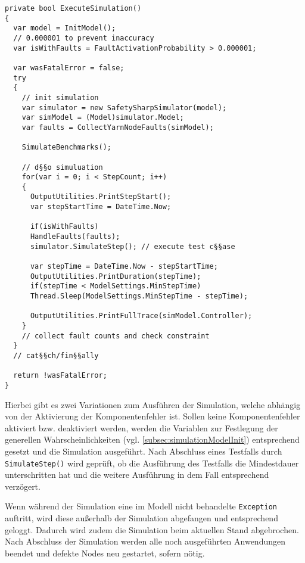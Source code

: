 \begin{lstlisting}[label=lst:hadoopSimulation,style=cs,
caption={[Ausführung der Simulation]
    Ausführung der Simulation (gekürzt).}]
private bool ExecuteSimulation()
{
  var model = InitModel();
  // 0.000001 to prevent inaccuracy
  var isWithFaults = FaultActivationProbability > 0.000001;
  
  var wasFatalError = false;
  try
  {
    // init simulation
    var simulator = new SafetySharpSimulator(model);
    var simModel = (Model)simulator.Model;
    var faults = CollectYarnNodeFaults(simModel);
    
    SimulateBenchmarks();
    
    // d§§o simuluation
    for(var i = 0; i < StepCount; i++)
    {
      OutputUtilities.PrintStepStart();
      var stepStartTime = DateTime.Now;
      
      if(isWithFaults)
      HandleFaults(faults);
      simulator.SimulateStep(); // execute test c§§ase
      
      var stepTime = DateTime.Now - stepStartTime;
      OutputUtilities.PrintDuration(stepTime);
      if(stepTime < ModelSettings.MinStepTime)
      Thread.Sleep(ModelSettings.MinStepTime - stepTime);
      
      OutputUtilities.PrintFullTrace(simModel.Controller);
    }
    // collect fault counts and check constraint
  }
  // cat§§ch/fin§§ally
  
  return !wasFatalError;
}
\end{lstlisting}

Hierbei gibt es zwei Variationen zum Ausführen der Simulation, welche abhängig von der Aktivierung der Komponentenfehler ist.
Sollen keine Komponentenfehler aktiviert bzw. deaktiviert werden, werden die Variablen zur Festlegung der generellen Wahrscheinlichkeiten (vgl. \cref{subsec:simulationModelInit}) entsprechend gesetzt und die Simulation ausgeführt.
Nach Abschluss eines Testfalls durch \texttt{SimulateStep()} wird geprüft, ob die Ausführung des Testfalls die Mindestdauer unterschritten hat und die weitere Ausführung in dem Fall entsprechend verzögert.

Wenn während der Simulation eine im Modell nicht behandelte \texttt{Exception} auftritt, wird diese außerhalb der Simulation abgefangen und entsprechend geloggt.
Dadurch wird zudem die Simulation beim aktuellen Stand abgebrochen.
Nach Abschluss der Simulation werden alle noch ausgeführten Anwendungen beendet und defekte Nodes neu gestartet, sofern nötig.

